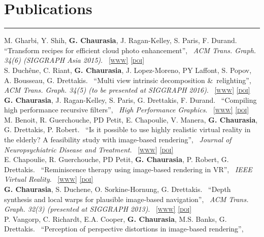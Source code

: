 \documentclass[10pt]{article}
\newcommand{\amper}{{\scshape\&}~}
\newcommand{\notes}[1]{\marginnote{\color{Gray}\scriptsize #1}}
\newcommand{\customsection}[1]{\section*{#1}\vspace{-0.2cm}\hrule\vspace{0.1cm}}
\newcommand{\paper}[1]{{``#1'',~}}
\newcommand{\authors}[1]{{#1.~}}
\newcommand{\journal}[1]{\emph{#1}.~}
\newcommand{\html}[1]{\href{#1}{\scriptsize\scshape{[www]}}}
\newcommand{\doi}[1]{\href{#1}{\scriptsize\scshape{[doi]}}}
\begin{document}
\customsection{Publications}
\noindent
\notes{2015}
\authors{M. Gharbi, Y. Shih, {\bfseries G. Chaurasia}, J. Ragan-Kelley, S. Paris, F. Durand}
\paper{Transform recipes for efficient cloud photo enhancement}
\journal{ACM Trans. Graph. 34(6) (SIGGRAPH Asia 2015)}
\html{http://people.csail.mit.edu/gharbi/xform_recipe/}
\doi{http://dx.doi.org/10.1145/2816795.2818127}
\\[0.18cm]
%
\notes{2015}
\authors{S. Duch\^{e}ne, C. Riant, {\bfseries G. Chaurasia}, J. Lopez-Moreno, PY Laffont, S. Popov, A. Bousseau, G. Drettakis}
\paper{Multi view intrinsic decomposition \amper relighting}
\journal{ACM Trans. Graph. 34(5) (to be presented at SIGGRAPH 2016)}
\html{http://www-sop.inria.fr/reves/Basilic/2015/DRCLLPD15/}
\doi{http://dx.doi.org/10.1145/2790060.2790063}
\\[0.18cm]
%
\notes{2015}
\authors{{\bfseries G. Chaurasia}, J. Ragan-Kelley, S. Paris, G. Drettakis, F. Durand}
\paper{Compiling high performance recursive filters}
\journal{High Performance Graphics}
\html{https://mit-gfx.github.io/recfilter/}
\doi{http://dx.doi.org/10.1145/2790060.2790063}
\\[0.18cm]
%
\notes{2015}
\authors{M. Benoit, R. Guerchouche, PD Petit, E. Chapoulie, V. Manera, {\bfseries G. Chaurasia}, G. Drettakis, P. Robert}
\paper{Is it possible to use highly realistic virtual reality in the elderly? A feasibility study with image-based rendering}
\journal{Journal of Neuropsychiatric Disease and Treatment}
\html{http://www.dovepress.com/articles.php?article_id=20707}
\doi{http://dx.doi.org/10.2147/NDT.S73179}\\[0.18cm]
%
\notes{2014}
\authors{E. Chapoulie, R. Guerchouche, PD Petit, {\bfseries G. Chaurasia}, P. Robert, G. Drettakis}
\paper{Reminiscence therapy using image-based rendering in VR}
\journal{IEEE Virtual Reality}
\html{http://www-sop.inria.fr/reves/Basilic/2014/CGPCRD14/}
\doi{http://dx.doi.org/10.1109/VR.2014.6802049}\\[0.18cm]
%
\notes{2013}
\authors{{\bfseries G. Chaurasia}, S. Duchene, O. Sorkine-Hornung, G. Drettakis}
\paper{Depth synthesis and local warps for plausible image-based navigation}
\journal{ACM Trans. Graph. 32(3) (presented at SIGGRAPH 2013)}
\html{http://www-sop.inria.fr/reves/Basilic/2013/CDSD13/}
\doi{http://dx.doi.org/10.1145/2487228.2487238}\\[0.18cm]
%
\notes{2013}
\authors{P. Vangorp, C. Richardt, E.A. Cooper, {\bfseries G. Chaurasia}, M.S. Banks, G. Drettakis}
\paper{Perception of perspective distortions in image-based rendering}
\end{document}
